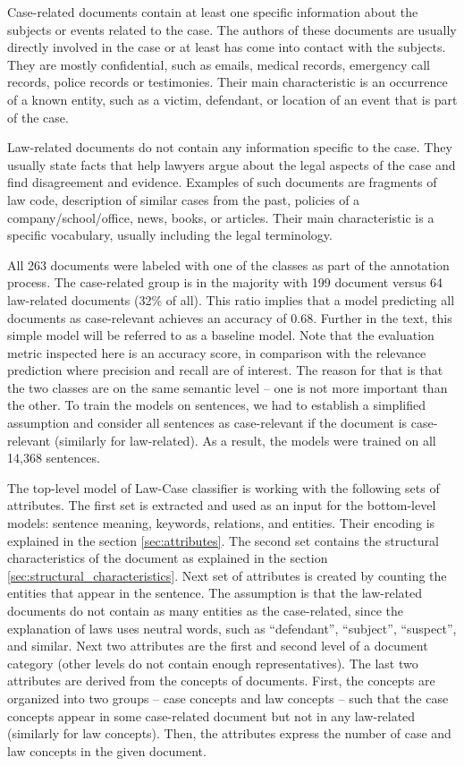 \documentclass[
  digital, %
  notable,   %
  nolof,     %
  nolot,     %
]{fithesis3}
\begin{document}
Case-related documents contain at least one specific information about the subjects or events related to the case. 
The authors of these documents are usually directly involved in the case or at least has come into contact with the subjects.
They are mostly confidential, such as emails, medical records, emergency call records, police records or testimonies.
Their main characteristic is an occurrence of a known entity, such as a victim, defendant, or location of an event that is part of the case.

Law-related documents do not contain any information specific to the case.
They usually state facts that help lawyers argue about the legal aspects of the case and find disagreement and evidence.
Examples of such documents are fragments of law code, description of similar cases from the past, policies of a company/school/office, news, books, or articles.
Their main characteristic is a specific vocabulary, usually including the legal terminology.

All 263 documents were labeled with one of the classes as part of the annotation process.
The case-related group is in the majority with 199 document versus 64 law-related documents (32\% of all).
This ratio implies that a model predicting all documents as case-relevant achieves an accuracy of 0.68.
Further in the text, this simple model will be referred to as a baseline model.
Note that the evaluation metric inspected here is an accuracy score, in comparison with the relevance prediction where precision and recall are of interest.
The reason for that is that the two classes are on the same semantic level -- one is not more important than the other.
To train the models on sentences, we had to establish a simplified assumption and consider all sentences as case-relevant if the document is case-relevant (similarly for law-related).
As a result, the models were trained on all 14,368 sentences.

The top-level model of Law-Case classifier is working with the following sets of attributes.
The first set is extracted and used as an input for the bottom-level models: sentence meaning, keywords, relations, and entities.
Their encoding is explained in the section \ref{sec:attributes}.
The second set contains the structural characteristics of the document as explained in the section \ref{sec:structural_characteristics}.
Next set of attributes is created by counting the entities that appear in the sentence.
The assumption is that the law-related documents do not contain as many entities as the case-related, since the explanation of laws uses neutral words, such as ``defendant'', ``subject'', ``suspect'', and similar.
Next two attributes are the first and second level of a document category (other levels do not contain enough representatives).
The last two attributes are derived from the concepts of documents.
First, the concepts are organized into two groups -- case concepts and law concepts -- such that the case concepts appear in some case-related document but not in any law-related (similarly for law concepts).
Then, the attributes express the number of case and law concepts in the given document.
\end{document}
